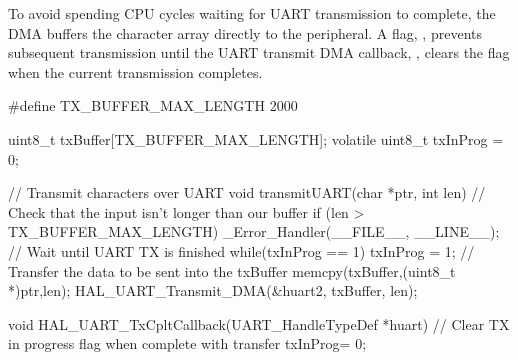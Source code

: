 To avoid spending CPU cycles waiting for UART transmission to complete, the DMA buffers the character array directly to the peripheral. A flag, , prevents subsequent transmission until the UART transmit DMA callback, , clears the flag when the current transmission completes.
\begin{clisting}[caption={UART Transmit},label={list:uart_transmit}]
#define TX_BUFFER_MAX_LENGTH 2000 

uint8_t txBuffer[TX_BUFFER_MAX_LENGTH];
volatile uint8_t txInProg = 0;

// Transmit characters over UART
void transmitUART(char *ptr, int len)
{  
    // Check that the input isn't longer than our buffer
    if (len > TX_BUFFER_MAX_LENGTH){
        _Error_Handler(__FILE__, __LINE__);
    }
    // Wait until UART TX is finished
    while(txInProg == 1){}
    txInProg = 1;
    // Transfer the data to be sent into the txBuffer
    memcpy(txBuffer,(uint8_t *)ptr,len);
    HAL_UART_Transmit_DMA(&huart2, txBuffer, len); 
}

void HAL_UART_TxCpltCallback(UART_HandleTypeDef *huart)
{
    // Clear TX in progress flag when complete with transfer
    txInProg= 0;
}
\end{clisting}

